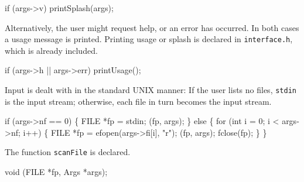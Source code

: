 \nwenddocs{}\endmoddef\nwstartdeflinemarkup{}\nwenddeflinemarkup
if (args->v)
  printSplash(args);

\nwendcode{}\nwdocspar
Alternatively, the user might request help, or an error has
occurred. In both cases a usage message is printed. Printing
usage or splash is declared in \texttt{interface.h}, which is already included.

\nwenddocs{}\plusendmoddef\nwstartdeflinemarkup{}\nwenddeflinemarkup
if (args->h || args->err)
  printUsage();

\nwendcode{}\nwdocspar
Input is dealt with in the standard UNIX manner: If the user lists no
files, \texttt{stdin} is the input stream; otherwise, each file in
turn becomes the input stream.

\nwenddocs{}\endmoddef\nwstartdeflinemarkup{}\nwenddeflinemarkup
if (args->nf == 0) \{
  FILE *fp = stdin;
  (fp, args);
\} else \{
  for (int i = 0; i < args->nf; i++) \{
    FILE *fp = efopen(args->fi[i], "r");
    (fp, args);
    fclose(fp);
  \}
\}

\nwendcode{}\nwdocspar
The function \texttt{scanFile} is declared.

\nwenddocs{}\endmoddef\nwstartdeflinemarkup{}\nwenddeflinemarkup
void (FILE *fp, Args *args);

